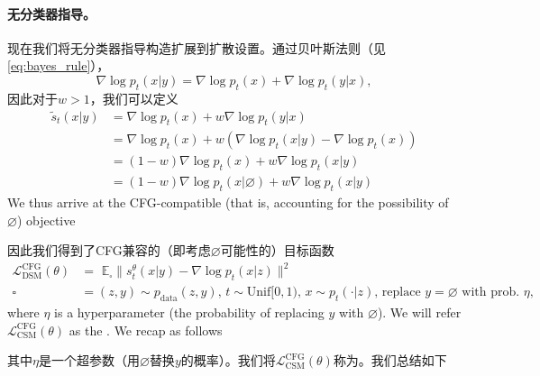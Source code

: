 \paragraph{无分类器指导。} 现在我们将无分类器指导构造扩展到扩散设置。通过贝叶斯法则（见\cref{eq:bayes_rule}），
\begin{equation*}
    \nabla \log p_t(x|y) = \nabla \log p_t(x) + \nabla \log p_t(y|x),
\end{equation*}
因此对于$w > 1$，我们可以定义
\begin{align*}
    \tilde{s}_t(x|y) &= \nabla \log p_t(x) + w \nabla \log p_t(y|x)\\
                    &= \nabla \log p_t(x) + w (\nabla \log p_t(x|y) - \nabla \log p_t(x))\\
                    &= (1-w) \nabla \log p_t(x) + w \nabla \log p_t(x|y)\\
                    &= (1-w) \nabla \log p_t(x|\varnothing) + w \nabla \log p_t(x|y)
\end{align*}
We thus arrive at the CFG-compatible (that is, accounting for the possibility of $\varnothing$) objective 

因此我们得到了CFG兼容的（即考虑$\varnothing$可能性的）目标函数 
\begin{align}
    \label{eq:cfg_guided_dsm}
    \mathcal{L}_{\text{DSM}}^{\text{CFG}}(\theta) &= \,\,\mathbb{E}_{\square} \lVert s_t^{\theta}(x|y) - \nabla \log p_t(x|z)\rVert^2\\
    \square &= (z,y) \sim p_{\text{data}}(z,y),\, t \sim \text{Unif}[0,1),\, x \sim p_t(\cdot|z),\,\text{replace }y=\varnothing\text{ with prob. }\eta,
\end{align}
where $\eta$ is a hyperparameter (the probability of replacing $y$ with $\varnothing$). We will refer $\mathcal{L}_{\text{CSM}}^{\text{CFG}}(\theta)$ as the . We recap as follows

其中$\eta$是一个超参数（用$\varnothing$替换$y$的概率）。我们将$\mathcal{L}_{\text{CSM}}^{\text{CFG}}(\theta)$称为。我们总结如下

